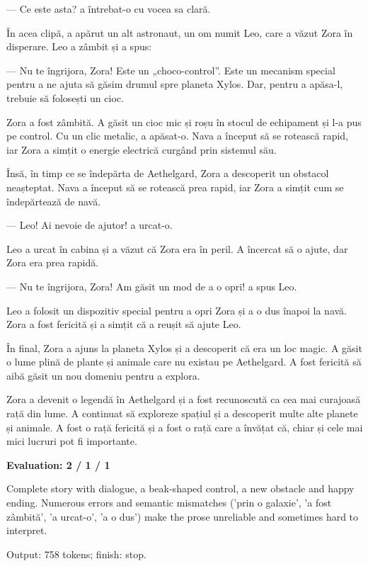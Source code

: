 \documentclass[10pt]{article}
\begin{document}
{\begin{minipage}{\textwidth}
\par\smallskip
— Ce este asta? a întrebat-o cu vocea sa clară.
\par\smallskip
În acea clipă, a apărut un alt astronaut, un om numit Leo, care a văzut Zora în disperare. Leo a zâmbit și a spus:
\par\smallskip
— Nu te îngrijora, Zora! Este un „choco-control”. Este un mecanism special pentru a ne ajuta să găsim drumul spre planeta Xylos. Dar, pentru a apăsa-l, trebuie să folosești un cioc.
\par\smallskip
Zora a fost zâmbită. A găsit un cioc mic și roșu în stocul de echipament și l-a pus pe control. Cu un clic metalic, a apăsat-o. Nava a început să se rotească rapid, iar Zora a simțit o energie electrică curgând prin sistemul său.
\par\smallskip
Însă, în timp ce se îndepărta de Aethelgard, Zora a descoperit un obstacol neașteptat. Nava a început să se rotească prea rapid, iar Zora a simțit cum se îndepărtează de navă.
\par\smallskip
— Leo! Ai nevoie de ajutor! a urcat-o.
\par\smallskip
Leo a urcat în cabina și a văzut că Zora era în peril. A încercat să o ajute, dar Zora era prea rapidă.
\par\smallskip
— Nu te îngrijora, Zora! Am găsit un mod de a o opri! a spus Leo.
\par\smallskip
Leo a folosit un dispozitiv special pentru a opri Zora și a o dus înapoi la navă. Zora a fost fericită și a simțit că a reușit să ajute Leo.
\par\smallskip
În final, Zora a ajuns la planeta Xylos și a descoperit că era un loc magic. A găsit o lume plină de plante și animale care nu existau pe Aethelgard. A fost fericită să aibă găsit un nou domeniu pentru a explora.
\par\smallskip
Zora a devenit o legendă în Aethelgard și a fost recunoscută ca cea mai curajoasă rață din lume. A continuat să exploreze spațiul și a descoperit multe alte planete și animale. A fost o rață fericită și a fost o rață care a învățat că, chiar și cele mai mici lucruri pot fi importante.\par\smallskip
\textbf{Evaluation: 2 / 1 / 1}\par Complete story with dialogue, a beak-shaped control, a new obstacle and happy ending. Numerous errors and semantic mismatches ('prin o galaxie', 'a fost zâmbită', 'a urcat-o', 'a o dus') make the prose unreliable and sometimes hard to interpret.
\par {\color{gray} Output: 758 tokens; finish: stop.}\par

\end{minipage}}
\end{document}
